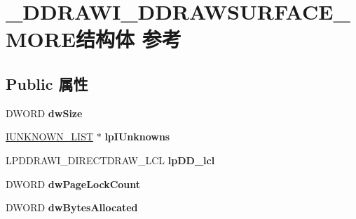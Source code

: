 \hypertarget{struct___d_d_r_a_w_i___d_d_r_a_w_s_u_r_f_a_c_e___m_o_r_e}{}\section{\+\_\+\+D\+D\+R\+A\+W\+I\+\_\+\+D\+D\+R\+A\+W\+S\+U\+R\+F\+A\+C\+E\+\_\+\+M\+O\+R\+E结构体 参考}
\label{struct___d_d_r_a_w_i___d_d_r_a_w_s_u_r_f_a_c_e___m_o_r_e}
\subsection*{Public 属性}
\begin{DoxyCompactItemize}
\item 
\mbox{\label{struct___d_d_r_a_w_i___d_d_r_a_w_s_u_r_f_a_c_e___m_o_r_e_acb49bc2b5792a00d2e82d3dfde923e75}} 
D\+W\+O\+RD {\bfseries dw\+Size}
\item 
\mbox{\label{struct___d_d_r_a_w_i___d_d_r_a_w_s_u_r_f_a_c_e___m_o_r_e_a6dfdb21bace33a7d787b2717bab82c1f}} 
\hyperlink{struct___i_u_n_k_n_o_w_n___l_i_s_t}{I\+U\+N\+K\+N\+O\+W\+N\+\_\+\+L\+I\+ST} $\ast$ {\bfseries lp\+I\+Unknowns}
\item 
\mbox{\label{struct___d_d_r_a_w_i___d_d_r_a_w_s_u_r_f_a_c_e___m_o_r_e_a772ff78cb83325d46782705aaac2ef91}} 
L\+P\+D\+D\+R\+A\+W\+I\+\_\+\+D\+I\+R\+E\+C\+T\+D\+R\+A\+W\+\_\+\+L\+CL {\bfseries lp\+D\+D\+\_\+lcl}
\item 
\mbox{\label{struct___d_d_r_a_w_i___d_d_r_a_w_s_u_r_f_a_c_e___m_o_r_e_a05cabaa64fa95b81433f27fead3fb3cc}} 
D\+W\+O\+RD {\bfseries dw\+Page\+Lock\+Count}
\item 
\mbox{\label{struct___d_d_r_a_w_i___d_d_r_a_w_s_u_r_f_a_c_e___m_o_r_e_a38d4cd3619f14ad21c5e4fec1c6fab5a}} 
D\+W\+O\+RD {\bfseries dw\+Bytes\+Allocated}
\item 
\mbox{\label{struct___d_d_r_a_w_i___d_d_r_a_w_s_u_r_f_a_c_e___m_o_r_e_a8d544a3fcf7cd91cead63dbcb5e3ea84}} 

\end{DoxyCompactItemize}
